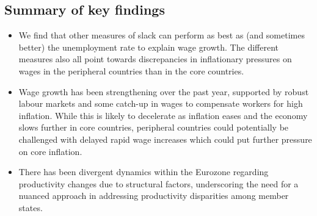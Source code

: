 \subsection{Summary of key findings}
\begin{itemize}
    \item We find that other measures of slack can perform as best as (and sometimes better) the unemployment rate to explain wage growth. The different measures also all point towards discrepancies in inflationary pressures on wages in the peripheral countries than in the core countries.
    \item Wage growth has been strengthening over the past year, supported by robust labour markets and some catch-up in wages to compensate workers for high inflation. While this is likely to decelerate as inflation eases and the economy slows further in core countries, peripheral countries could potentially be challenged with delayed rapid wage increases which could put further pressure on core inflation.
    \item There has been divergent dynamics within the Eurozone regarding productivity changes due to structural factors, underscoring the need for a nuanced approach in addressing productivity disparities among member states.
\end{itemize}